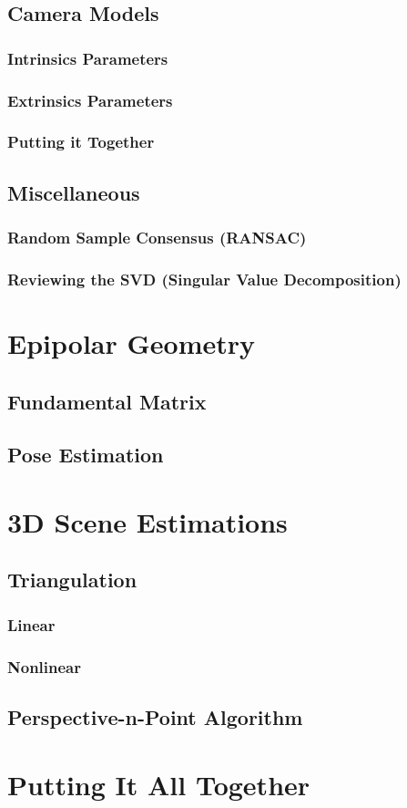 \documentclass{book}
\begin{document}
        \section{Camera Models}
            \subsection{Intrinsics Parameters}

            \subsection{Extrinsics Parameters}

            \subsection{Putting it Together}

        \section{Miscellaneous}
            \subsection{Random Sample Consensus (RANSAC)}
        
            \subsection{Reviewing the SVD (Singular Value Decomposition)}

    \chapter{Epipolar Geometry} 
        \section{Fundamental Matrix}

        \section{Pose Estimation}

    \chapter{3D Scene Estimations}
        \section{Triangulation}
            \subsection{Linear}
            \subsection{Nonlinear}

        \section{Perspective-n-Point Algorithm}

    \chapter{Putting It All Together}
\end{document}
